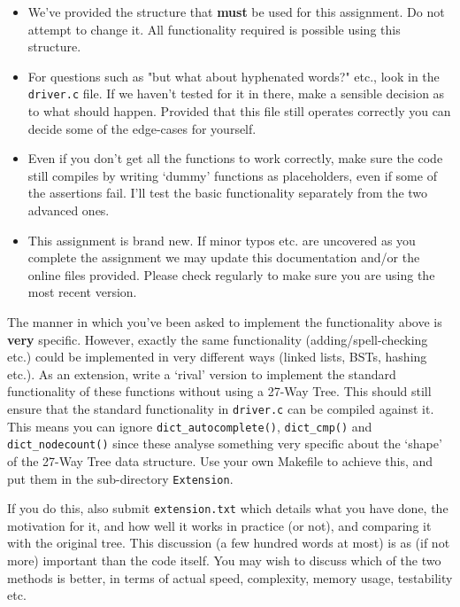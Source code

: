 \begin{exercise}
\begin{itemize}

\item We've provided the structure that {\bf must} be used for this
assignment.  Do not attempt to change it. All functionality required is
possible using this structure.

\item For questions such as "but what about hyphenated words?" etc., look
in the \verb^driver.c^ file. If we haven't tested for it in there, make a
sensible decision as to what should happen. Provided that this file still
operates correctly you can decide some of the edge-cases for yourself.

\item Even if you don't get all the functions to work correctly, make sure
the code still compiles by writing `dummy' functions as placeholders,
even if some of the assertions fail. I'll test the basic functionality
separately from the two advanced ones.

\item This assignment is brand new. If minor typos etc. are uncovered
as you complete the assignment we may update this documentation and/or
the online files provided. Please check regularly to make sure you are
using the most recent version.

\end{itemize}

\vspace*{1cm}
\vspace*{1ex}

\noindent The manner in which you've been asked to implement the
functionality above is {\bf very} specific. However, exactly the same
functionality (adding/spell-checking etc.)  could be implemented in very
different ways (linked lists, BSTs, hashing etc.).  As an extension,
write a `rival' version to implement the standard functionality of these
functions without using a 27-Way Tree.  This should still ensure that the
standard functionality in \verb^driver.c^ can be compiled against it. This
means you can ignore \verb^dict_autocomplete()^, \verb^dict_cmp()^ and
\verb^dict_nodecount()^ since these analyse something very specific about
the `shape' of the 27-Way Tree data structure.  Use your own Makefile
to achieve this, and put them in the sub-directory \verb^Extension^.

If you do this, also submit \verb^extension.txt^ which details what you
have done, the motivation for it, and how well it works in practice
(or not), and comparing it with the original tree.  This discussion
(a few hundred words at most) is as (if not more) important than the
code itself. You may wish to discuss which of the two methods is better,
in terms of actual speed, complexity, memory usage, testability etc.


\end{exercise}
